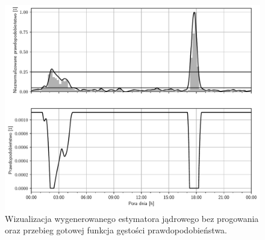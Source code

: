 \begin{figure}
    \centering\includegraphics[width=1.00\textwidth]{img/transformation.pdf}
    \caption{Wizualizacja wygenerowanego estymatora jądrowego bez progowania oraz przebieg gotowej funkcja gęstości prawdopodobieństwa.} \label{fig:transform}
\end{figure}



